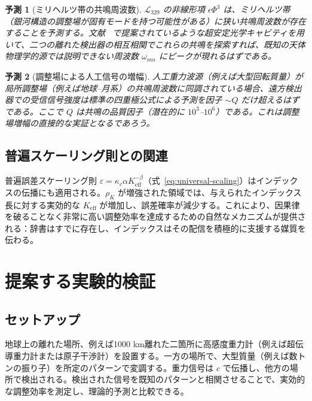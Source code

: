 \documentclass[12pt,a4paper]{article}
\newcommand{\Keff}{K_{\mathrm{eff}}}
\newcommand{\kappac}{\kappa_c}
\newcommand{\eps}{\varepsilon}
\newtheorem{prediction}{予測}   %
\begin{document}
	\begin{prediction}[ミリヘルツ帯の共鳴周波数]
		\(\mathcal{L}_{329}\) の非線形項 \(\epsilon \Phi^3\) は、ミリヘルツ帯（銀河構造の調整場が固有モードを持つ可能性がある）に狭い共鳴周波数が存在することを予測する。文献~\cite{Barontini2025} で提案されているような超安定光学キャビティを用いて、二つの離れた検出器の相互相関でこれらの共鳴を探索すれば、既知の天体物理学的源では説明できない周波数 \(\omega_{mn}\) にピークが現れるはずである。
	\end{prediction}
	
	\begin{prediction}[調整場による人工信号の増幅]
		人工重力波源（例えば大型回転質量）が局所調整場（例えば地球–月系）の共鳴周波数に同調されている場合、遠方検出器での受信信号強度は標準の四重極公式による予測を因子 \(\sim Q\) だけ超えるはずである。ここで \(Q\) は共鳴の品質因子（潜在的に \(10^3\)–\(10^6\)）である。これは調整場増幅の直接的な実証となるであろう。
	\end{prediction}
	
	\subsection{普遍スケーリング則との関連}
	
	普遍誤差スケーリング則 \(\eps = \kappac\alpha\Keff^{-\beta}\)（式~\ref{eq:universal-scaling}）はインデックスの伝播にも適用される。\(\rho_K\) が増強された領域では、与えられたインデックス長に対する実効的な \(\Keff\) が増加し、誤差確率が減少する。これにより、因果律を破ることなく非常に高い調整効率を達成するための自然なメカニズムが提供される：辞書はすでに存在し、インデックスはその配信を積極的に支援する媒質を伝わる。
	
	\section{提案する実験的検証}
	\label{sec:experiment}
	
	\subsection{セットアップ}
	
	地球上の離れた場所、例えば1000 km離れた二箇所に高感度重力計（例えば超伝導重力計または原子干渉計）を設置する。一方の場所で、大型質量（例えば数トンの振り子）を所定のパターンで変調する。重力信号は \(c\) で伝播し、他方の場所で検出される。検出された信号を既知のパターンと相関させることで、実効的な調整効率を測定し、理論的予測と比較できる。
	
\end{document}
